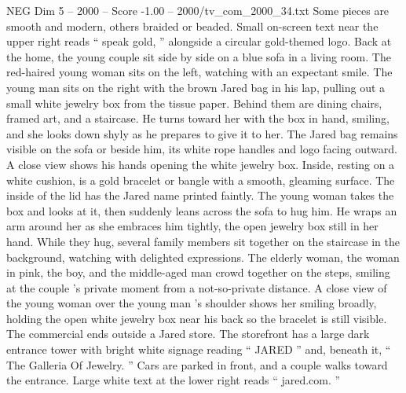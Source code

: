 \begin{textsample}{NEG Dim 5 – 2000 – Score -1.00 – 2000/tv\_com\_2000\_34.txt}
Some pieces are smooth and modern, others braided or beaded.
Small on-screen text near the upper right reads “ speak gold, ” alongside a circular gold-themed logo.
Back at the home, the young couple sit side by side on a blue sofa in a living room.
The red-haired young woman sits on the left, watching with an expectant smile.
The young man sits on the right with the brown Jared bag in his lap, pulling out a small white jewelry box from the tissue paper.
Behind them are dining chairs, framed art, and a staircase.
He turns toward her with the box in hand, smiling, and she looks down shyly as he prepares to give it to her.
The Jared bag remains visible on the sofa or beside him, its white rope handles and logo facing outward.
A close view shows his hands opening the white jewelry box.
Inside, resting on a white cushion, is a gold bracelet or bangle with a smooth, gleaming surface.
The inside of the lid has the Jared name printed faintly.
The young woman takes the box and looks at it, then suddenly leans across the sofa to hug him.
He wraps an arm around her as she embraces him tightly, the open jewelry box still in her hand.
While they hug, several family members sit together on the staircase in the background, watching with delighted expressions.
The elderly woman, the woman in pink, the boy, and the middle-aged man crowd together on the steps, smiling at the couple ’s private moment from a not-so-private distance.
A close view of the young woman over the young man ’s shoulder shows her smiling broadly, holding the open white jewelry box near his back so the bracelet is still visible.
The commercial ends outside a Jared store.
The storefront has a large dark entrance tower with bright white signage reading “ JARED ” and, beneath it, “ The Galleria Of Jewelry. ” Cars are parked in front, and a couple walks toward the entrance.
Large white text at the lower right reads “ jared.com. ”

\end{textsample}
